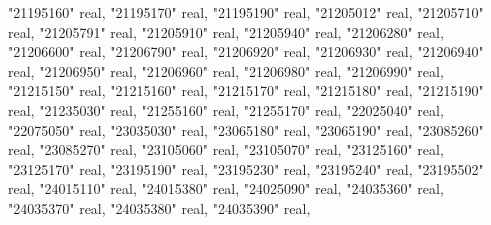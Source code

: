 \documentclass[12pt,twoside]{reedthesis}
\newenvironment{Shaded}{\begin{snugshade}}{\end{snugshade}}
\newcommand{\DataTypeTok}[1]{\textcolor[rgb]{0.13,0.29,0.53}{#1}}
\newcommand{\NormalTok}[1]{#1}
\newcommand{\OtherTok}[1]{\textcolor[rgb]{0.56,0.35,0.01}{#1}}
\begin{document}
\begin{Shaded}
\begin{Highlighting}[]
     \OtherTok{"21195160"} \DataTypeTok{real}\NormalTok{, }\OtherTok{"21195170"} \DataTypeTok{real}\NormalTok{, }\OtherTok{"21195190"} \DataTypeTok{real}\NormalTok{, }\OtherTok{"21205012"} \DataTypeTok{real}\NormalTok{, }\OtherTok{"21205710"} \DataTypeTok{real}\NormalTok{, }\OtherTok{"21205791"} \DataTypeTok{real}\NormalTok{, }
     \OtherTok{"21205910"} \DataTypeTok{real}\NormalTok{, }\OtherTok{"21205940"} \DataTypeTok{real}\NormalTok{, }\OtherTok{"21206280"} \DataTypeTok{real}\NormalTok{, }\OtherTok{"21206600"} \DataTypeTok{real}\NormalTok{, }\OtherTok{"21206790"} \DataTypeTok{real}\NormalTok{, }\OtherTok{"21206920"} \DataTypeTok{real}\NormalTok{, }
     \OtherTok{"21206930"} \DataTypeTok{real}\NormalTok{, }\OtherTok{"21206940"} \DataTypeTok{real}\NormalTok{, }\OtherTok{"21206950"} \DataTypeTok{real}\NormalTok{, }\OtherTok{"21206960"} \DataTypeTok{real}\NormalTok{, }\OtherTok{"21206980"} \DataTypeTok{real}\NormalTok{, }\OtherTok{"21206990"} \DataTypeTok{real}\NormalTok{, }
     \OtherTok{"21215150"} \DataTypeTok{real}\NormalTok{, }\OtherTok{"21215160"} \DataTypeTok{real}\NormalTok{, }\OtherTok{"21215170"} \DataTypeTok{real}\NormalTok{, }\OtherTok{"21215180"} \DataTypeTok{real}\NormalTok{, }\OtherTok{"21215190"} \DataTypeTok{real}\NormalTok{, }\OtherTok{"21235030"} \DataTypeTok{real}\NormalTok{, }
     \OtherTok{"21255160"} \DataTypeTok{real}\NormalTok{, }\OtherTok{"21255170"} \DataTypeTok{real}\NormalTok{, }\OtherTok{"22025040"} \DataTypeTok{real}\NormalTok{, }\OtherTok{"22075050"} \DataTypeTok{real}\NormalTok{, }\OtherTok{"23035030"} \DataTypeTok{real}\NormalTok{, }\OtherTok{"23065180"} \DataTypeTok{real}\NormalTok{, }
     \OtherTok{"23065190"} \DataTypeTok{real}\NormalTok{, }\OtherTok{"23085260"} \DataTypeTok{real}\NormalTok{, }\OtherTok{"23085270"} \DataTypeTok{real}\NormalTok{, }\OtherTok{"23105060"} \DataTypeTok{real}\NormalTok{, }\OtherTok{"23105070"} \DataTypeTok{real}\NormalTok{, }\OtherTok{"23125160"} \DataTypeTok{real}\NormalTok{, }
     \OtherTok{"23125170"} \DataTypeTok{real}\NormalTok{, }\OtherTok{"23195190"} \DataTypeTok{real}\NormalTok{, }\OtherTok{"23195230"} \DataTypeTok{real}\NormalTok{, }\OtherTok{"23195240"} \DataTypeTok{real}\NormalTok{, }\OtherTok{"23195502"} \DataTypeTok{real}\NormalTok{, }\OtherTok{"24015110"} \DataTypeTok{real}\NormalTok{, }
     \OtherTok{"24015380"} \DataTypeTok{real}\NormalTok{, }\OtherTok{"24025090"} \DataTypeTok{real}\NormalTok{, }\OtherTok{"24035360"} \DataTypeTok{real}\NormalTok{, }\OtherTok{"24035370"} \DataTypeTok{real}\NormalTok{, }\OtherTok{"24035380"} \DataTypeTok{real}\NormalTok{, }\OtherTok{"24035390"} \DataTypeTok{real}\NormalTok{, }

\end{Highlighting}
\end{Shaded}
\end{document}
